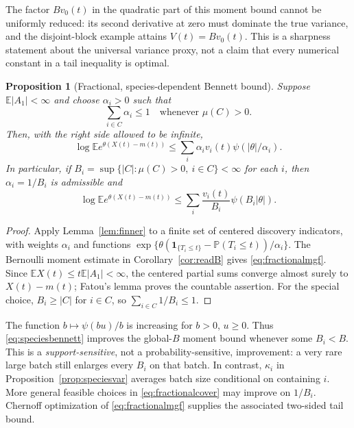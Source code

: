 \documentclass[11pt]{article}
\numberwithin{equation}{section}
\newtheorem{proposition}[theorem]{Proposition}
\theoremstyle{definition}
\theoremstyle{remark}
\newcommand{\E}{\mathbb E}
\newcommand{\Pp}{\mathbb P}
\newcommand{\ind}{\mathbf 1}
\begin{document}
The factor $Bv_0(t)$ in the quadratic part of this moment bound cannot be
uniformly reduced: its second derivative at zero must dominate the true
variance, and the disjoint-block example attains $V(t)=Bv_0(t)$. This is a
sharpness statement about the universal variance proxy, not a claim that every
numerical constant in a tail inequality is optimal.

\begin{proposition}[Fractional, species-dependent Bennett bound]\label{prop:fractionalbennett}
Suppose $\E|A_1|<\infty$ and choose $\alpha_i>0$ such that
\begin{equation}\label{eq:fractionalcover}
 \sum_{i\in C}\alpha_i\le1\quad\text{whenever }\mu(C)>0.
\end{equation}
Then, with the right side allowed to be infinite,
\begin{equation}\label{eq:fractionalmgf}
 \log\E e^{\theta(X(t)-m(t))}
 \le\sum_i\alpha_i v_i(t)\psi(|\theta|/\alpha_i).
\end{equation}
In particular, if $B_i=\sup\{|C|:\mu(C)>0,\ i\in C\}<\infty$ for each $i$,
then $\alpha_i=1/B_i$ is admissible and
\begin{equation}\label{eq:speciesbennett}
 \log\E e^{\theta(X(t)-m(t))}
 \le\sum_i\frac{v_i(t)}{B_i}\psi(B_i|\theta|).
\end{equation}
\end{proposition}
\begin{proof}
Apply Lemma~\ref{lem:finner} to a finite set of centered discovery indicators,
with weights $\alpha_i$ and functions
$\exp\{\theta(\ind_{\{T_i\le t\}}-\Pp(T_i\le t))/\alpha_i\}$.
The Bernoulli moment estimate in Corollary~\ref{cor:readB} gives
\eqref{eq:fractionalmgf}. Since $\E X(t)\le t\E|A_1|<\infty$, the centered
partial sums converge almost surely to $X(t)-m(t)$; Fatou's lemma proves
the countable assertion. For the special choice, $B_i\ge|C|$ for $i\in C$,
so $\sum_{i\in C}1/B_i\le1$.
\end{proof}

The function $b\mapsto\psi(bu)/b$ is increasing for $b>0$, $u\ge0$.
Thus \eqref{eq:speciesbennett} improves the global-$B$ moment bound whenever
some $B_i<B$. This is a \emph{support-sensitive}, not a probability-sensitive,
improvement: a very rare large batch still enlarges every $B_i$ on that batch.
In contrast, $\kappa_i$ in Proposition~\ref{prop:speciesvar} averages batch size
conditional on containing $i$. More general feasible choices in
\eqref{eq:fractionalcover} may improve on $1/B_i$. Chernoff optimization of
\eqref{eq:fractionalmgf} supplies the associated two-sided tail bound.
\end{document}
